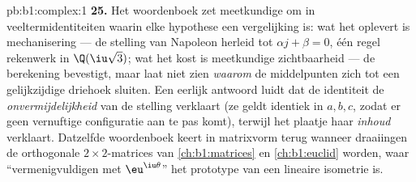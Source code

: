 \begin{solution}{pb:b1:complex:1}
\textbf{25.} Het woordenboek zet meetkundige  om in
veeltermidentiteiten waarin elke hypothese een vergelijking is: wat het
oplevert is mechanisering --- de stelling van Napoleon herleid tot
$\alpha j + \beta = 0$, één regel rekenwerk in $\Q(\iu\sqrt3)$; wat het
kost is meetkundige zichtbaarheid --- de berekening bevestigt, maar laat
niet zien \emph{waarom} de middelpunten zich tot een gelijkzijdige
driehoek sluiten. Een eerlijk antwoord luidt dat de identiteit de
\emph{onvermijdelijkheid} van de stelling verklaart (ze geldt identiek in
$a, b, c$, zodat er geen vernuftige configuratie aan te pas komt),
terwijl het plaatje haar \emph{inhoud} verklaart. Datzelfde woordenboek
keert in matrixvorm terug wanneer draaiingen de orthogonale
$2 \times 2$-matrices van \cref{ch:b1:matrices} en \cref{ch:b1:euclid}
worden, waar ``vermenigvuldigen met $\eu^{\iu\theta}$'' het prototype van
een lineaire isometrie is.
\end{solution}
